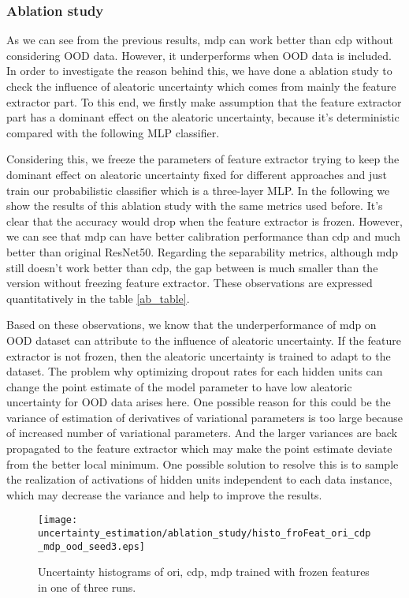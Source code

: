 \subsubsection{Ablation study}
As we can see from the previous results, mdp can work better than cdp without considering OOD data. However, it underperforms when OOD data is included. In order to investigate the reason behind this, we have done a ablation study to check the influence of aleatoric uncertainty which comes from mainly the feature extractor part. To this end, we firstly make assumption that the feature extractor part has a dominant effect on the aleatoric uncertainty, because it's deterministic compared with the following MLP classifier. 

Considering this, we freeze the parameters of feature extractor trying to keep the dominant effect on aleatoric uncertainty fixed for different approaches and just train our probabilistic classifier which is a three-layer MLP. In the following we show the results of this ablation study with the same metrics used before. It's clear that the accuracy would drop when the feature extractor is frozen. However, we can see that mdp can have better  calibration performance than cdp and much better than original ResNet50. Regarding the separability metrics, although mdp still doesn't work better than cdp, the gap between is much smaller than the version without freezing feature extractor. These observations are expressed quantitatively in the table \ref{ab_table}. 

Based on these observations, we know that the underperformance of mdp on OOD dataset can attribute to the influence of aleatoric uncertainty. If the feature extractor is not frozen, then the aleatoric uncertainty is trained to adapt to the dataset. The problem why optimizing dropout rates for each hidden units can change the point estimate of the model parameter to have low aleatoric uncertainty for OOD data arises here. One possible reason for this could be the variance of estimation of derivatives of variational parameters is too large because of increased number of variational parameters\cite{kingma2015variational}. And the larger variances are back propagated to the feature extractor which may make the point estimate deviate from the better local minimum. One possible solution to resolve this is to sample the realization of activations of hidden units independent to each data instance, which may decrease the variance and help to improve the results. 

\begin{figure}[H]
	\begin{center}
		\texttt{[image: uncertainty\_estimation/ablation\_study/histo\_froFeat\_ori\_cdp\_mdp\_ood\_seed3.eps]}
		\caption{Uncertainty histograms of ori, cdp, mdp trained with frozen features in one of three runs.}		
		\label{ab_reliability}
	\end{center}
\end{figure}

